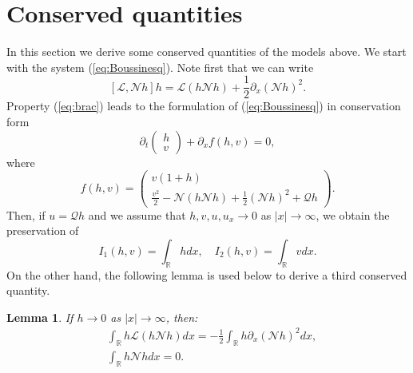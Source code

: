 \documentclass[final,11pt,a4paper,reqno]{amsart}
\newcommand{\RR}{\mathbb R}
\newtheorem{lemma}[satz]{Lemma}
\theoremstyle{definition}
\begin{document}
\section{Conserved quantities}\label{sec:quantities}
In this section we derive some conserved quantities of the models above. We start with the system (\ref{eq:Boussinesq}). Note first that we can write
\begin{equation}\label{eq:brac}
\left[\mathscr{L},\mathscr{N}h\right]h=\mathscr{L}\left(h\mathscr{N}h\right)+\frac{1}{2}\partial_{x}\left(\mathscr{N}h\right)^{2}.
\end{equation}
Property (\ref{eq:brac}) leads to the formulation of (\ref{eq:Boussinesq})
in conservation form
\begin{equation*}
\partial_{t}\begin{pmatrix}h\\ v\end{pmatrix}+\partial_{x}f(h,v)=0,
\end{equation*}
where 
\begin{equation*}
f(h,v)=\begin{pmatrix} v(1+h)\\\frac{v^{2}}{2}-\mathscr{N}\left(h\mathscr{N}h\right)+\frac{1}{2}\left(\mathscr{N}h\right)^{2}+\mathscr{Q}h\end{pmatrix}.
\end{equation*}
Then, if $u=\mathscr{Q}h$ and we assume that $h,v,u,u_{x}\rightarrow 0$ as $|x|\rightarrow\infty$, we obtain the preservation of
$$I_{1}(h,v)=\int_{\RR}hdx,\quad I_{2}(h,v)=\int_{\RR}vdx.$$
On the other hand, the following lemma is used below to derive a third conserved quantity.
\begin{lemma}
\label{lemm1}
If $h\rightarrow 0$ as $|x|\rightarrow\infty$, then:
\begin{subequations}\label{eq:l1}
\begin{align}
&\int_{\RR}h\mathscr{L}\left(h\mathscr{N}h\right)dx=-\frac{1}{2}\int_{\RR}h\partial_{x}\left(\mathscr{N}h\right)^{2}dx ,\nonumber\\
&\int_{\RR}h\mathscr{N}hdx=0.
\end{align}
\end{subequations}
\end{lemma}
\end{document}
